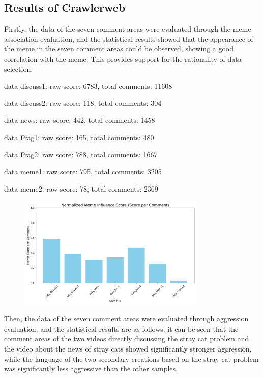 \documentclass[12pt,a4paper]{ctexart}
\begin{document}

\subsection{Results of Crawlerweb}

Firstly, the data of the seven comment areas were evaluated through the meme association evaluation, and the statistical results showed that the appearance of the meme in the seven comment areas could be observed, showing a good correlation with the meme. This provides support for the rationality of data selection.

data discuss1: raw score: 6783, total comments: 11608

data discuss2: raw score: 118, total comments: 304

data news: raw score: 442, total comments: 1458

data Frag1: raw score: 165, total comments: 480

data Frag2: raw score: 788, total comments: 1667

data meme1: raw score: 795, total comments: 3205

data meme2: raw score: 78, total comments: 2369

\begin{figure}[htbp]
    \centering
    \includegraphics[width=0.8\textwidth]{img/meme_score.png}
\end{figure}
\newpage

Then, the data of the seven comment areas were evaluated through aggression evaluation, and the statistical results are as follows: it can be seen that the comment areas of the two videos directly discussing the stray cat problem and the video about the news of stray cats showed significantly stronger aggression, while the language of the two secondary creations based on the stray cat problem was significantly less aggressive than the other samples.
\end{document}
